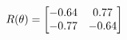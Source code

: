 \documentclass[preview]{standalone}
\begin{document}
\begin{align*}
\special{dvisvgm:raw <g id='unique000'>}R(\theta) = \begin{bmatrix}-0.64 & 0.77\\-0.77 & -0.64\end{bmatrix}\special{dvisvgm:raw </g>}
\end{align*}
\end{document}
